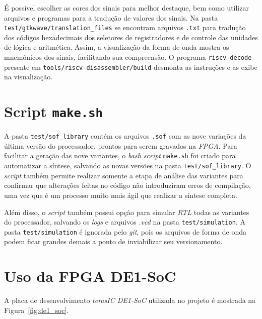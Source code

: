     { É possível escolher as cores dos sinais para melhor destaque, bem como
        utilizar arquivos e programas para a tradução de valores dos sinais.
        Na pasta \texttt{test/gtkwave/translation\_files} se encontram arquivos
        \texttt{.txt} para tradução dos códigos hexadecimais dos seletores de
        registradores e de controle das unidades de lógica e aritmética. Assim,
        a visualização da forma de onda mostra os mnemônicos dos sinais, facilitando
        sua compreensão. O programa \texttt{riscv-decode} presente em
        \texttt{tools/riscv-disassembler/build} desmonta as instruções e as exibe
        na visualização.
    }


\section{Script \texttt{make.sh}}
    { A pasta \texttt{test/sof\_library} contém os arquivos \texttt{.sof} com
        as nove variações da última versão do processador, prontos para serem
        gravados na \textit{FPGA}. Para facilitar a geração das nove variantes,
        o \textit{bash script} \texttt{make.sh} foi criado para automatizar a
        síntese, salvando as novas versões na pasta \texttt{test/sof\_library}.
        O \textit{script} também permite realizar somente a etapa de
        análise das variantes para confirmar que alterações feitas no código não
        introduziram erros de compilação, uma vez que é um processo muito mais
        ágil que realizar a síntese completa.
    }

    { Além disso, o \textit{script} também possui opção para simular \textit{RTL}
        todas as variantes do processador, salvando os \textit{logs} e arquivos
        \textit{.vcd} na pasta \texttt{test/simulation}. A pasta \texttt{test/simulation}
        é ignorada pelo \textit{git}, pois os arquivos de forma de onda podem
        ficar grandes demais a ponto de inviabilizar seu versionamento.
    }

    \section{Uso da FPGA DE1-SoC}
    { A placa de desenvolvimento \textit{terasIC DE1-SoC} utilizada no projeto
        é mostrada na Figura~\ref{fig:de1_soc}.
    }

